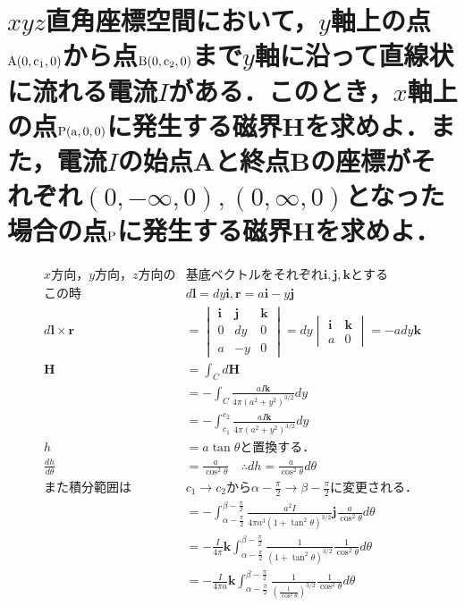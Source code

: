 \documentclass[dvipdfmx]{ujarticle}
\begin{document}
\section{$xyz$直角座標空間において，$y$軸上の点$\rm{A}(0, c_{1}, 0)$から点$\rm{B}(0, c_{2}, 0)$まで$y$軸に沿って直線状に流れる電流$I$がある．このとき，$x$軸上の点$\rm{P}(a, 0, 0)$に発生する磁界$\boldsymbol{H}$を求めよ．また，電流$I$の始点Aと終点Bの座標がそれぞれ$(0, -\infty, 0), (0, \infty, 0)$となった場合の点$\rm{P}$に発生する磁界$\boldsymbol{H}$を求めよ．}
	\begin{align*}
	x方向，y方向，z方向の&基底ベクトルをそれぞれ\boldsymbol{i},\boldsymbol{j},\boldsymbol{k}とする\\
	この時&d\boldsymbol{l}=dy\boldsymbol{i}, \boldsymbol{r}=a\boldsymbol{i}-y\boldsymbol{j}\\
	d\boldsymbol{l}\times \boldsymbol{r}&=
	\begin{vmatrix}
	\boldsymbol{i} & \boldsymbol{j} & \boldsymbol{k}\\
	0 &dy & 0\\
	a & -y &0
	\end{vmatrix}
	=dy
	\begin{vmatrix}
	\boldsymbol{i}  & \boldsymbol{k}\\
	a & 0
	\end{vmatrix}
	=-ady\boldsymbol{k}\\
	\boldsymbol{H}&=\int_{C} d\boldsymbol{H}\\
	&=-\int_{C} \frac{aI\boldsymbol{k}}{4\pi(a^{2}+y^{2})^{3/2}}dy\\
	&=-\int_{c_{1}}^{c_{2}} \frac{aI\boldsymbol{k}}{4\pi(a^{2}+y^{2})^{3/2}}dy\\
	h&=a\tan \theta と置換する．\\
	\frac{dh}{d\theta}&=\frac{a}{\cos ^{2}\theta } \quad \therefore dh=\frac{a}{\cos ^{2}\theta }d\theta \\
	また積分範囲は&c_{1}\to c_{2}から\alpha-\frac{\pi}{2} \to \beta -\frac{\pi}{2}に変更される．\\
	&=-\int_{\alpha-\frac{\pi}{2}}^{\beta -\frac{\pi}{2}} \frac{a^{2}I}{4\pi a^{3}(1+\tan^{2}\theta)^{3/2}}\boldsymbol{j} \frac{a}{\cos ^{2}\theta }d\theta\\
	&=-\frac{I}{4\pi} \boldsymbol{k}\int_{\alpha-\frac{\pi}{2}}^{\beta -\frac{\pi}{2}} \frac{1}{(1+\tan^{2}\theta)^{3/2}} \frac{1}{\cos ^{2}\theta }d\theta\\
	&=-\frac{I}{4\pi a} \boldsymbol{k} \int_{\alpha-\frac{\pi}{2}}^{\beta -\frac{\pi}{2}} \frac{1}{(\frac{1}{\cos^{2} \theta })^{3/2}} \frac{1}{\cos ^{2}\theta }d\theta\\

\end{align*}
\end{document}
